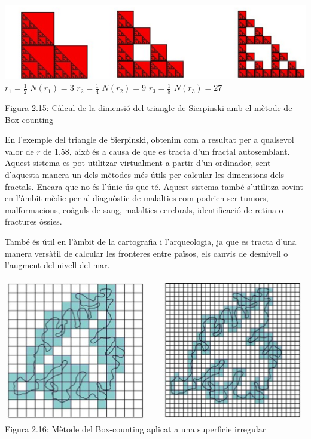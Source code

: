 \documentclass[12pt]{report}
\begin{document}
\begin{center}
 \includegraphics[width=1\textwidth]{Minskowski.PNG}
 \hspace*{1.25em} $r_1 = \frac{1}{2}$ $N(r_1)=3$
\hspace*{5em} $r_2 = \frac{1}{4}$ $N(r_2)=9$
\hspace*{7.75em} $r_3 = \frac{1}{8}$ $N(r_3)=27$


 Figura 2.15: Càlcul de la dimensió del triangle de Sierpinski amb el mètode de Box-counting
 \end{center}
En l'exemple del triangle de Sierpinski, obtenim com a resultat per a qualsevol valor de $r$ de 1,58, això és a causa de que es tracta d'un fractal autosemblant.
\newline
Aquest sistema es pot utilitzar virtualment a partir d'un ordinador, sent d'aquesta manera un dels mètodes més útils per calcular les dimensions dels fractals. Encara que no és l'únic ús que té. Aquest sistema també s'utilitza sovint en l'àmbit mèdic per al diagnòstic de malalties com podrien ser tumors, malformacions, coàguls de sang, malalties cerebrals, identificació de retina o fractures òssies.

També és útil en l'àmbit de la cartografia i l'arqueologia, ja que es tracta d'una manera versàtil de calcular les fronteres entre països, els canvis de desnivell o l'augment del nivell del mar.


\begin{center}
 \includegraphics[width=1\textwidth]{Cartografia.PNG}
      Figura 2.16: Mètode del Box-counting aplicat a una superficie irregular
 \end{center}
\end{document}
